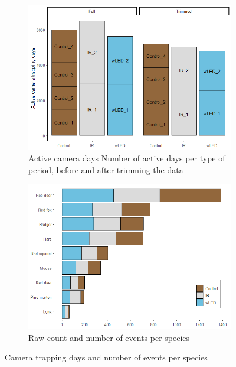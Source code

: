 \begin{figure}
\begin{subfigure}{.5\textwidth}
 \centering
	\includegraphics[scale=.4]{../R/glmm_sp_files/figure-html/active-days-3.png}
 \caption[Active camera days]
 {Active camera days %
 Number of active days per type of period, before and after trimming the data}
 \label{fig:active days}
\end{subfigure}
\begin{subfigure}{.5\textwidth}
 \centering
	\includegraphics[scale=.4]{../R/glmm_sp_files/figure-html/events-1.png}
 \caption[Raw count and number of events per species]
 {Raw count and number of events per species}
\end{subfigure}
\caption{Camera trapping days and number of events per species}
\end{figure}



